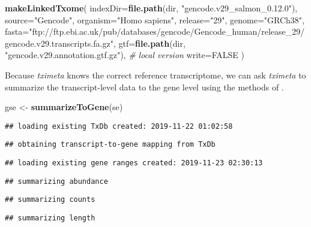 \documentclass[
  9pt,
  a4paper,
]{extarticle}
\newenvironment{Shaded}{\begin{snugshade}}{\end{snugshade}}
\newcommand{\CommentTok}[1]{\textcolor[rgb]{0.56,0.35,0.01}{\textit{#1}}}
\newcommand{\DataTypeTok}[1]{\textcolor[rgb]{0.13,0.29,0.53}{#1}}
\newcommand{\KeywordTok}[1]{\textcolor[rgb]{0.13,0.29,0.53}{\textbf{#1}}}
\newcommand{\NormalTok}[1]{#1}
\newcommand{\OtherTok}[1]{\textcolor[rgb]{0.56,0.35,0.01}{#1}}
\newcommand{\StringTok}[1]{\textcolor[rgb]{0.31,0.60,0.02}{#1}}
\begin{document}
\begin{Shaded}
\begin{Highlighting}[]
\KeywordTok{makeLinkedTxome}\NormalTok{(}
  \DataTypeTok{indexDir=}\KeywordTok{file.path}\NormalTok{(dir, }\StringTok{"gencode.v29_salmon_0.12.0"}\NormalTok{),}
  \DataTypeTok{source=}\StringTok{"Gencode"}\NormalTok{,}
  \DataTypeTok{organism=}\StringTok{"Homo sapiens"}\NormalTok{,}
  \DataTypeTok{release=}\StringTok{"29"}\NormalTok{,}
  \DataTypeTok{genome=}\StringTok{"GRCh38"}\NormalTok{,}
  \DataTypeTok{fasta=}\StringTok{"ftp://ftp.ebi.ac.uk/pub/databases/gencode/Gencode_human/release_29/gencode.v29.transcripts.fa.gz"}\NormalTok{,}
  \DataTypeTok{gtf=}\KeywordTok{file.path}\NormalTok{(dir, }\StringTok{"gencode.v29.annotation.gtf.gz"}\NormalTok{), }\CommentTok{# local version}
  \DataTypeTok{write=}\OtherTok{FALSE}
\NormalTok{)}
\end{Highlighting}
\end{Shaded}

Because \emph{tximeta} knows the correct reference transcriptome, we can ask
\emph{tximeta} to summarize the transcript-level data to the gene level using the
methods of \citet{Soneson2015}.

\begin{Shaded}
\begin{Highlighting}[]
\NormalTok{gse <-}\StringTok{ }\KeywordTok{summarizeToGene}\NormalTok{(se)}
\end{Highlighting}
\end{Shaded}

\begin{verbatim}
## loading existing TxDb created: 2019-11-22 01:02:58
\end{verbatim}

\begin{verbatim}
## obtaining transcript-to-gene mapping from TxDb
\end{verbatim}

\begin{verbatim}
## loading existing gene ranges created: 2019-11-23 02:30:13
\end{verbatim}

\begin{verbatim}
## summarizing abundance
\end{verbatim}

\begin{verbatim}
## summarizing counts
\end{verbatim}

\begin{verbatim}
## summarizing length
\end{verbatim}
\end{document}
